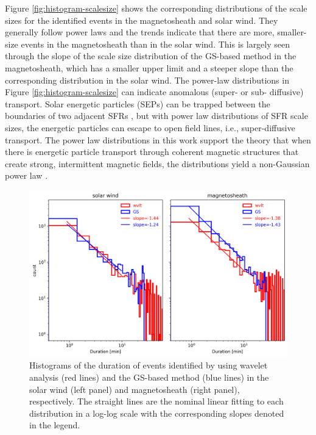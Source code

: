 Figure \ref{fig:histogram-scalesize} shows the corresponding distributions of the scale sizes for the identified events in the magnetosheath and solar wind. They generally follow power laws and the trends indicate that there are more, smaller-size events in the magnetosheath than in the solar wind. This is largely seen through the slope of the scale size distribution of the GS-based method in the magnetosheath, which has a smaller upper limit and a steeper slope than the corresponding distribution in the solar wind. The power-law distributions in Figure \ref{fig:histogram-scalesize} can indicate anomalous (super- or sub- diffusive) transport. Solar energetic particles (SEPs) can be trapped between the boundaries of two adjacent SFRs \citep{leRoux:2023}, but with power law distributions of SFR scale sizes, the energetic particles can escape to open field lines, i.e., super-diffusive transport. The power law distributions in this work support the theory that when there is energetic particle transport through coherent magnetic structures that create strong, intermittent magnetic fields, the distributions yield a non-Gaussian power law \citep{leRoux:2021}.

\begin{figure}
    \centering
    \includegraphics[width=\textwidth]{Figures/Histograms/histogram_duration.png}
    \caption[Histograms of duration for identified events]{Histograms of the duration of events identified by using wavelet analysis (red lines) and the GS-based method (blue lines) in the solar wind (left panel) and magnetosheath (right panel), respectively. The straight lines are the nominal linear fitting to each distribution in a log-log scale with the corresponding slopes denoted in the legend.}
    \label{fig:histogram-duration}
\end{figure}

